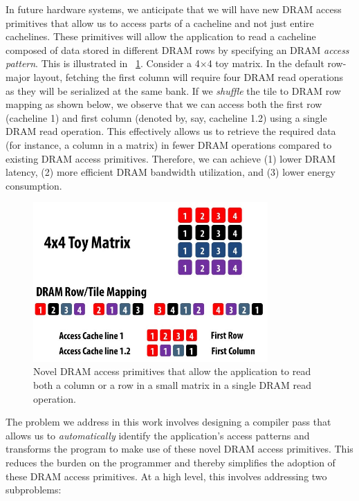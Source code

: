 \documentclass[letterpaper]{article}
\begin{document}
In future hardware systems, we anticipate that we will have new DRAM access
primitives that allow us to access parts of a cacheline and not just 
entire cachelines.
These primitives will allow the application to read a cacheline 
composed of data stored in different DRAM rows by specifying 
an DRAM \textit{access pattern}. This is illustrated in ~\cref{fig:primitives}.
Consider a 4$\times$4 toy matrix. In the default row-major layout,
fetching the first column will require four DRAM read operations as
they will be serialized at the same bank. If we \textit{shuffle} 
the tile to DRAM row mapping as shown below, we observe that we can
access both the first row (cacheline 1) and first column (denoted by, say,
cacheline 1.2) using a single DRAM read operation.
This effectively allows us to retrieve the required data (for instance, a column
in a matrix) in fewer DRAM operations compared to existing DRAM access primitives. 
Therefore, we can achieve (1) lower DRAM latency, (2) more efficient DRAM
bandwidth utilization, and (3) lower energy consumption.

\begin{figure}[ht]
	\centering
	\includegraphics[width=0.8\textwidth]{images/primitives}
	\caption{Novel DRAM access primitives that allow the application to read
	both a column or a row in a small matrix in a single DRAM read operation.}
	\label{fig:primitives}
\end{figure}


The problem we address in this work involves designing a compiler pass that 
allows us to \textit{automatically} identify the application's access
patterns and transforms the program to make use of these novel DRAM access
primitives. 
This reduces the burden on the programmer and thereby simplifies the adoption
of these DRAM access primitives.
At a high level, this involves addressing two subproblems: 
\end{document}
